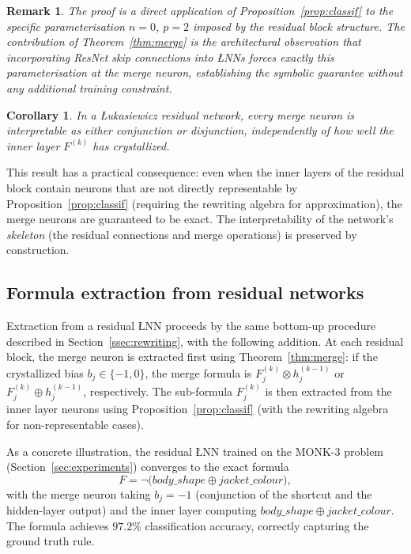 \documentclass[12pt,a4paper]{article}
\newtheorem{corollary}[theorem]{Corollary}
\newtheorem{remark}[theorem]{Remark}
\newcommand{\tnorm}{\otimes}      %
\newcommand{\disj}{\oplus}        %
\newcommand{\LNN}{\L{}NN}
\begin{document}
\begin{remark}
The proof is a direct application of Proposition~\ref{prop:classif} to the
specific parameterisation $n=0$, $p=2$ imposed by the residual block
structure.
The contribution of Theorem~\ref{thm:merge} is the architectural observation
that incorporating ResNet skip connections into \LNN{}s forces exactly this
parameterisation at the merge neuron, establishing the symbolic guarantee
without any additional training constraint.
\end{remark}

\begin{corollary}
In a \L{}ukasiewicz residual network, every merge neuron is
interpretable as either conjunction or disjunction, independently of
how well the inner layer $F^{(k)}$ has crystallized.
\end{corollary}

This result has a practical consequence: even when the inner layers of the
residual block contain neurons that are not directly representable by
Proposition~\ref{prop:classif} (requiring the rewriting algebra for
approximation), the merge neurons are guaranteed to be exact.
The interpretability of the network's \emph{skeleton} (the residual connections
and merge operations) is preserved by construction.

\subsection{Formula extraction from residual networks}
\label{ssec:res_extract}

Extraction from a residual \LNN{} proceeds by the same bottom-up procedure
described in Section~\ref{ssec:rewriting}, with the following addition.
At each residual block, the merge neuron is extracted first using
Theorem~\ref{thm:merge}: if the crystallized bias $b_j \in \{-1,0\}$, the
merge formula is $F^{(k)}_j \tnorm h^{(k-1)}_j$ or
$F^{(k)}_j \disj h^{(k-1)}_j$, respectively.
The sub-formula $F^{(k)}_j$ is then extracted from the inner layer neurons
using Proposition~\ref{prop:classif} (with the rewriting algebra for
non-representable cases).

As a concrete illustration, the residual \LNN{} trained on the MONK-3 problem
(Section~\ref{sec:experiments}) converges to the exact formula
\begin{equation}
  F = \neg\!\bigl(\mathit{body\_shape} \disj \mathit{jacket\_colour}\bigr),
  \label{eq:monk3}
\end{equation}
with the merge neuron taking $b_j = -1$ (conjunction of the shortcut and
the hidden-layer output) and the inner layer computing
$\mathit{body\_shape} \disj \mathit{jacket\_colour}$.
The formula achieves $97.2\%$ classification accuracy, correctly capturing the
ground truth rule.
\end{document}
